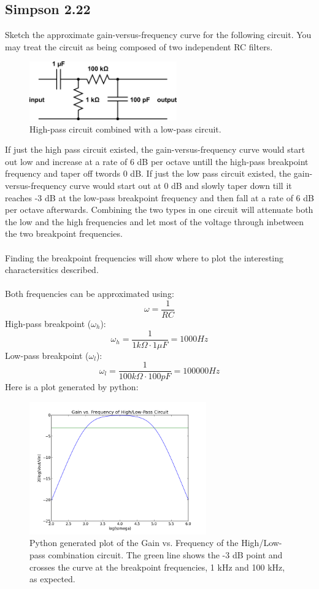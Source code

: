 \documentclass[a4paper,12pt]{article}
\newcommand{\F}[2]{\ensuremath{\frac{#1}{#2}}}
\begin{document}
\subsection*{Simpson 2.22}
Sketch the approximate gain-versus-frequency curve for the following circuit.  You may treat the circuit as being composed of two independent RC filters.

\begin{figure}[h]
\centering
\includegraphics[width=2.5in]{sam_lab2/simpson_high_low.png}
\caption{High-pass circuit combined with a low-pass circuit.}
\end{figure}
\noindent
If just the high pass circuit existed, the gain-versus-frequency curve would start out low and increase at a rate of 6 dB per octave untill the high-pass breakpoint frequency and taper off twords 0 dB.  If just the low pass circuit existed, the gain-versus-frequency curve would start out at 0 dB and slowly taper down till it reaches -3 dB at the low-pass breakpoint frequency and then fall at a rate of 6 dB per octave afterwards.  Combining the two types in one circuit will attenuate both the low and the high frequencies and let most of the voltage through inbetween the two breakpoint frequencies.
\\
\\
Finding the breakpoint frequencies will show where to plot the interesting charactersitics described.
\\
\\
Both frequencies can be approximated using:
\[\omega=\F{1}{RC}\]
High-pass breakpoint ($\omega_{h}$):
\[\omega_h=\F{1}{1k\Omega\cdot1\mu F}=1000Hz\]
Low-pass breakpoint ($\omega_l$):
\[\omega_l=\F{1}{100k\Omega\cdot100pF}=100000Hz\]
Here is a plot generated by python:
\begin{figure}[h]
\centering
\includegraphics[width=3in]{sam_lab2/log_log.png}
\caption{Python generated plot of the Gain vs. Frequency of the High/Low-pass combination circuit.  The green line shows the -3 dB point and crosses the curve at the breakpoint frequencies, 1 kHz and 100 kHz, as expected.}
\end{figure}  
\newpage
\end{document}
